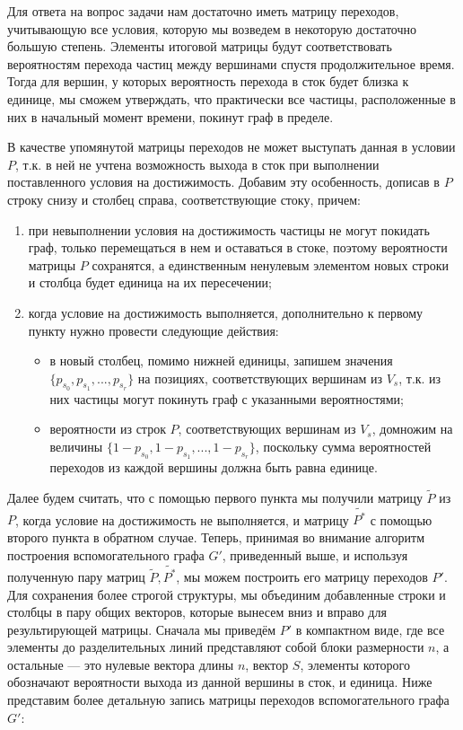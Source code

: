 	Для ответа на вопрос задачи нам достаточно иметь матрицу переходов, учитывающую все условия, которую мы возведем в некоторую достаточно большую степень. Элементы итоговой матрицы будут соответствовать вероятностям перехода частиц между вершинами спустя продолжительное время. Тогда для вершин, у которых вероятность перехода в сток будет близка к единице, мы сможем утверждать, что практически все частицы, расположенные в них в начальный момент времени, покинут граф в пределе. 
	
	В качестве упомянутой матрицы переходов не может выступать данная в условии $P$, т.к. в ней не учтена возможность выхода в сток при выполнении поставленного условия на достижимость. Добавим эту особенность, дописав в $P$ строку снизу и столбец справа, соответствующие стоку, причем:
	\begin{enumerate} 
		\item при невыполнении условия на достижимость частицы не могут покидать граф, только перемещаться в нем и оставаться в стоке, поэтому вероятности матрицы $P$ сохранятся, а единственным ненулевым элементом новых строки и столбца будет единица на их пересечении;
		\item когда условие на достижимость выполняется, дополнительно к первому пункту нужно провести следующие действия:
		\begin{itemize}
			\item в новый столбец, помимо нижней единицы, запишем значения $\{p_{s_0}, p_{s_1}, ... , p_{s_r}\}$ на позициях, соответствующих вершинам из $V_s$, т.к. из них частицы могут покинуть граф с указанными вероятностями;
			\item вероятности из строк $P$, соответствующих вершинам из $V_s$, домножим на величины $\{ 1 - p_{s_0}, 1 - p_{s_1}, ... , 1 - p_{s_r}\}$, поскольку сумма вероятностей переходов из каждой вершины должна быть равна единице.
		\end{itemize}	
	\end{enumerate}

	Далее будем считать, что с помощью первого пункта мы получили матрицу $\tilde{P}$ из $P$, когда условие на достижимость не выполняется, и матрицу $\tilde{P^*}$ с помощью второго пункта в обратном случае. Теперь, принимая во внимание алгоритм построения вспомогательного графа $G'$, приведенный выше, и используя полученную пару матриц $\tilde{P}, \tilde{P^*}$, мы можем построить его матрицу переходов $P'$. Для сохранения более строгой структуры, мы объединим добавленные строки и столбцы в пару общих векторов, которые вынесем вниз и вправо для результирующей матрицы. Сначала мы приведём $P'$ в компактном виде, где все элементы до разделительных линий представляют собой блоки размерности $n$, а остальные --- это нулевые вектора длины $n$, вектор $S$, элементы которого обозначают вероятности выхода из данной вершины в сток, и единица. Ниже представим более детальную запись матрицы переходов вспомогательного графа $G'$:
	
